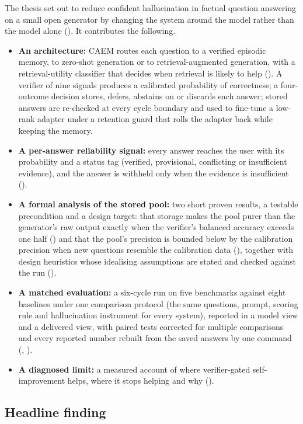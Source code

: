 The thesis set out to reduce confident hallucination in factual question answering on a small open generator by changing the system around the model rather than the model alone (). It contributes the following.
\begin{itemize}
    \item \textbf{An architecture:} CAEM routes each question to a verified episodic memory, to zero-shot generation or to retrieval-augmented generation, with a retrieval-utility classifier that decides when retrieval is likely to help (). A verifier of nine signals produces a calibrated probability of correctness; a four-outcome decision stores, defers, abstains on or discards each answer; stored answers are re-checked at every cycle boundary and used to fine-tune a low-rank adapter under a retention guard that rolls the adapter back while keeping the memory.
    \item \textbf{A per-answer reliability signal:} every answer reaches the user with its probability and a status tag (verified, provisional, conflicting or insufficient evidence), and the answer is withheld only when the evidence is insufficient ().
    \item \textbf{A formal analysis of the stored pool:} two short proven results, a testable precondition and a design target: that storage makes the pool purer than the generator's raw output exactly when the verifier's balanced accuracy exceeds one half () and that the pool's precision is bounded below by the calibration precision when new questions resemble the calibration data (), together with design heuristics whose idealising assumptions are stated and checked against the run ().
    \item \textbf{A matched evaluation:} a six-cycle run on five benchmarks against eight baselines under one comparison protocol (the same questions, prompt, scoring rule and hallucination instrument for every system), reported in a model view and a delivered view, with paired tests corrected for multiple comparisons and every reported number rebuilt from the saved answers by one command (, ).
    \item \textbf{A diagnosed limit:} a measured account of where verifier-gated self-improvement helps, where it stops helping and why ().
\end{itemize}

\subsection{Headline finding}
\label{sec:concl-headline}

